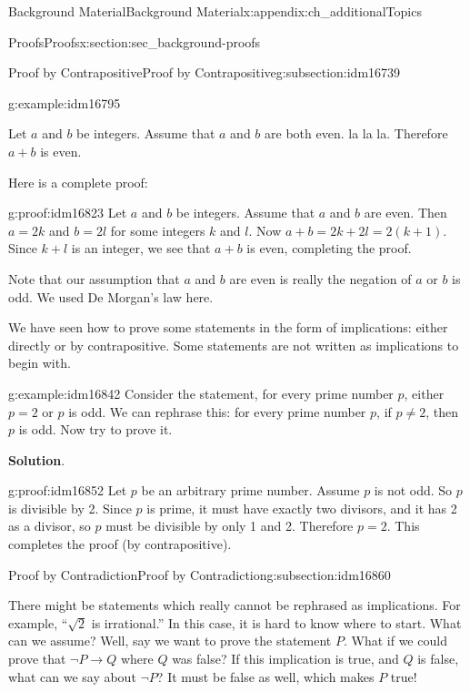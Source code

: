 \documentclass[oneside,10pt,]{book}
\numberwithin{equation}{chapter}
\def\imp{\rightarrow}
\begin{document}
\begin{appendixptx}{Background Material}{}{Background Material}{}{}{x:appendix:ch_additionalTopics}
\begin{sectionptx}{Proofs}{}{Proofs}{}{}{x:section:sec_background-proofs}
\begin{subsectionptx}{Proof by Contrapositive}{}{Proof by Contrapositive}{}{}{g:subsection:idm16739}
\begin{example}{}{g:example:idm16795}
\par
Let \(a\) and \(b\) be integers. Assume that \(a\) and \(b\) are both even. la la la. Therefore \(a+b\) is even.%
\par
Here is a complete proof:%
\begin{proofptx}{}{g:proof:idm16823}
Let \(a\) and \(b\) be integers. Assume that \(a\) and \(b\) are even. Then \(a = 2k\) and \(b = 2l\) for some integers \(k\) and \(l\). Now \(a + b = 2k + 2l = 2(k+1)\). Since \(k + l\) is an integer, we see that \(a + b\) is even, completing the proof.%
\end{proofptx}
Note that our assumption that \(a\) and \(b\) are even is really the negation of \(a\) or \(b\) is odd. We used De Morgan's law here.%
\end{example}
We have seen how to prove some statements in the form of implications: either directly or by contrapositive. Some statements are not written as implications to begin with.%
\begin{example}{}{g:example:idm16842}%
Consider the statement, for every prime number \(p\), either \(p = 2\) or \(p\) is odd. We can rephrase this: for every prime number \(p\), if \(p \ne 2\), then \(p\) is odd. Now try to prove it.%
\par\smallskip%
\noindent\textbf{Solution}.\hypertarget{g:solution:idm16851}{}\quad{}\begin{proofptx}{}{g:proof:idm16852}
Let \(p\) be an arbitrary prime number. Assume \(p\) is not odd. So \(p\) is divisible by 2. Since \(p\) is prime, it must have exactly two divisors, and it has 2 as a divisor, so \(p\) must be divisible by only 1 and 2. Therefore \(p = 2\). This completes the proof (by contrapositive).%
\end{proofptx}
\end{example}
\end{subsectionptx}
%
%
\typeout{************************************************}
\typeout{************************************************}
%
\begin{subsectionptx}{Proof by Contradiction}{}{Proof by Contradiction}{}{}{g:subsection:idm16860}
%
\par
There might be statements which really cannot be rephrased as implications. For example, ``\(\sqrt 2\) is irrational.'' In this case, it is hard to know where to start. What can we assume? Well, say we want to prove the statement \(P\). What if we could prove that \(\neg P \imp Q\) where \(Q\) was false? If this implication is true, and \(Q\) is false, what can we say about \(\neg P\)? It must be false as well, which makes \(P\) true!%

\end{subsectionptx}
\end{sectionptx}
\end{appendixptx}
\end{document}
